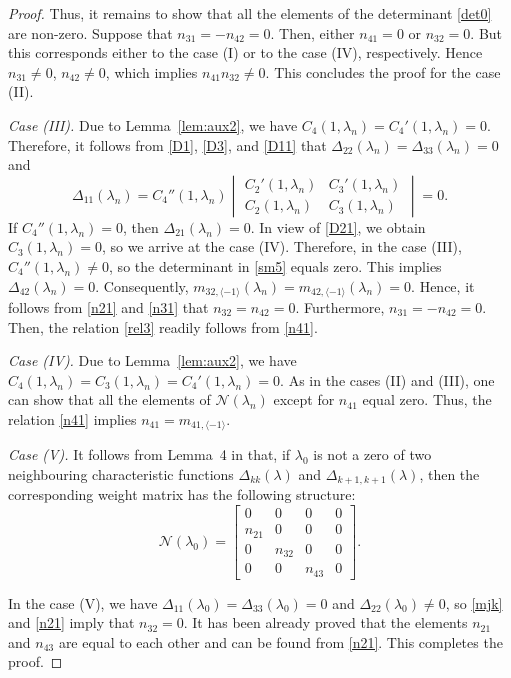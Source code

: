 \documentclass[a4paper,12pt]{article}
\newcommand{\la}{\lambda}
\theoremstyle{plain}
\numberwithin{equation}{section}
\theoremstyle{definition}
\theoremstyle{remark}
\begin{document}
\begin{proof}
Thus, it remains to show that all the elements of the determinant \eqref{det0} are non-zero. Suppose that $n_{31} = -n_{42} = 0$. Then, either $n_{41} = 0$ or $n_{32} = 0$. But this corresponds either to the case (I) or to the case (IV), respectively. Hence $n_{31} \ne 0$, $n_{42} \ne 0$, which implies $n_{41} n_{32} \ne 0$. This concludes the proof for the case (II).

\smallskip

\textit{Case (III).} Due to Lemma~\ref{lem:aux2}, we have $C_4(1, \la_n) = C_4'(1,\la_n) = 0$. Therefore, it follows from \eqref{D1}, \eqref{D3}, and \eqref{D11} that $\Delta_{22}(\la_n) = \Delta_{33}(\la_n) = 0$ and
\begin{equation} \label{sm5}
\Delta_{11}(\la_n) = C_4''(1,\la_n) 
\begin{vmatrix} 
C_2'(1,\la_n) & C_3'(1,\la_n) \\ 
C_2(1, \la_n) & C_3(1, \la_n)
\end{vmatrix} = 0.
\end{equation}
If $C_4''(1, \la_n) = 0$, then $\Delta_{21}(\la_n) = 0$. In view of \eqref{D21}, we obtain $C_3(1, \la_n) = 0$, so we arrive at the case (IV). Therefore, in the case (III), $C_4''(1,\la_n) \ne 0$, so the determinant in \eqref{sm5} equals zero. This implies $\Delta_{42}(\la_n) = 0$. Consequently, $m_{32,\langle -1 \rangle}(\la_n) = m_{42,\langle -1 \rangle}(\la_n) = 0$. Hence, it follows from \eqref{n21} and \eqref{n31} that $n_{32} = n_{42} =0$. Furthermore, $n_{31} = -n_{42} = 0$. Then, the relation \eqref{rel3} readily follows from \eqref{n41}.

\smallskip

\textit{Case (IV).} Due to Lemma~\ref{lem:aux2}, we have $C_4(1, \la_n) = C_3(1, \la_n) = C_4'(1, \la_n) = 0$. As in the cases (II) and (III), one can show that all the elements of $\mathcal N(\la_n)$ except for $n_{41}$ equal zero. Thus, the relation \eqref{n41} implies $n_{41} = m_{41,\langle -1 \rangle}$.

\smallskip 

\textit{Case (V).} It follows from Lemma~4 in \cite{Bond22-alg} that, 
if $\la_0$ is not a zero of two neighbouring characteristic functions $\Delta_{kk}(\la)$ and $\Delta_{k+1,k+1}(\la)$, then the corresponding weight matrix has the following structure:
$$
\mathcal N(\la_0) = \begin{bmatrix}
                        0 & 0 & 0 & 0 \\
                        n_{21} & 0 & 0 & 0 \\
                        0 & n_{32} & 0 & 0 \\
                        0 & 0 & n_{43} & 0
                    \end{bmatrix}.
$$

In the case (V), we have $\Delta_{11}(\la_0) = \Delta_{33}(\la_0) = 0$ and $\Delta_{22}(\la_0) \ne 0$, so \eqref{mjk} and \eqref{n21} imply that $n_{32} = 0$. It has been already proved that the elements $n_{21}$ and $n_{43}$ are equal to each other and can be found from \eqref{n21}.
This completes the proof.
\end{proof}
\end{document}
